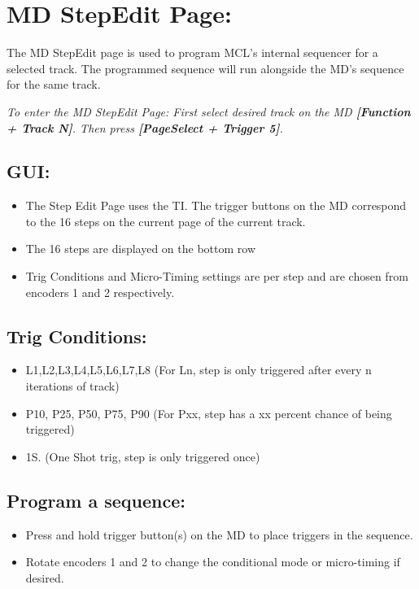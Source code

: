 \chapter{MD StepEdit Page:}

The MD StepEdit page is used to program MCL's internal sequencer for a selected track. The programmed sequence will run alongside the MD's sequence for the same track.


\textit{To enter the MD StepEdit Page: First select desired track on the MD \textbf{[Function + Track N]}. Then press \textbf{[PageSelect + Trigger 5]}.}



\section{GUI:}
\begin{itemize}
\item The Step Edit Page uses the TI. The trigger buttons on the MD correspond to the 16 steps on the current page of the current track.
\item The 16 steps are displayed on the bottom row
\item Trig Conditions and Micro-Timing settings are per step and are chosen from encoders 1 and 2 respectively.
\end{itemize}

\section{Trig Conditions:}
\begin{itemize}
\item L1,L2,L3,L4,L5,L6,L7,L8 (For Ln, step is only triggered after every n iterations of track)
\item P10, P25, P50, P75, P90 (For Pxx, step has a xx percent chance of being triggered)
\item 1S. (One Shot trig, step is only triggered once)
\end{itemize}

\vspace{-0.3cm}

\section{Program a sequence:}
\begin{itemize}
\item Press and hold trigger button(s) on the MD to place triggers in the sequence.
\item Rotate encoders 1 and 2 to change the conditional mode or micro-timing if desired.
\end{itemize}


